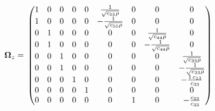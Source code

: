 \[\mathbf{\Omega}_z = \\
\begin{pmatrix}1 & 0 & 0 & 0 & 0 & \frac{1}{\sqrt{c_{55} \rho}} & 0 & 0 & 0\cr 1 & 0 & 0 & 0 & 0 & -\frac{1}{\sqrt{c_{55} \rho}} & 0 & 0 & 0\cr 0 & 1 & 0 & 0 & 0 & 0 & 0 & \frac{1}{\sqrt{c_{44} \rho}} & 0\cr 0 & 1 & 0 & 0 & 0 & 0 & 0 & -\frac{1}{\sqrt{c_{44} \rho}} & 0\cr 0 & 0 & 1 & 0 & 0 & 0 & 0 & 0 & \frac{1}{\sqrt{c_{33} \rho}}\cr 0 & 0 & 1 & 0 & 0 & 0 & 0 & 0 & -\frac{1}{\sqrt{c_{33} \rho}}\cr 0 & 0 & 0 & 1 & 0 & 0 & 0 & 0 & -\frac{1\,c_{13}}{c_{33}}\cr 0 & 0 & 0 & 0 & 1 & 0 & 0 & 0 & 0\cr 0 & 0 & 0 & 0 & 0 & 0 & 1 & 0 & -\frac{c_{23}}{c_{33}}\end{pmatrix}\]



